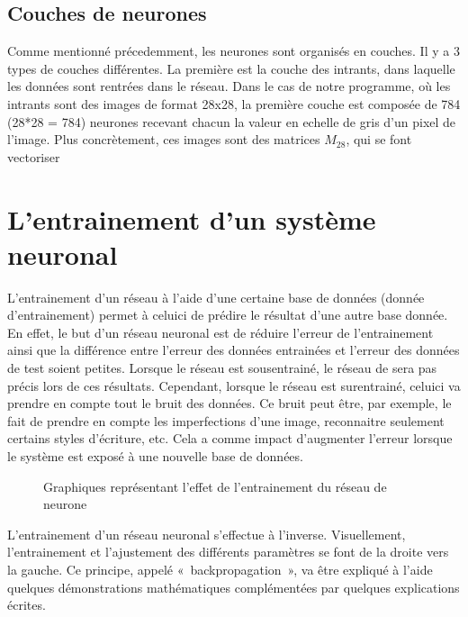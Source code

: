 \documentclass[letterpaper,10pt,french]{sphinxmanual}
\begin{document}
\subsection{Couches de neurones}
\label{\detokenize{OCR_SAM:couches-de-neurones}}
Comme mentionné précedemment, les neurones sont organisés en couches. Il y a 3 types de couches différentes. La première est la couche des intrants, dans laquelle
les données sont rentrées dans le réseau. Dans le cas de notre programme, où les intrants sont des images de format 28x28, la première couche est composée de 784 (28*28 = 784) neurones recevant chacun la valeur en echelle de gris  d’un pixel de l’image. Plus concrètement, ces images sont des matrices \(M_{28}\), qui se font vectoriser


\section{L’entrainement d’un système neuronal}
\label{\detokenize{OCR_SAM:l-entrainement-d-un-systeme-neuronal}}
L’entrainement d’un réseau à l’aide d’une certaine base de données (donnée d’entrainement) permet à celui\sphinxhyphen{}ci de prédire le résultat d’une autre base donnée. En effet, le but d’un réseau neuronal est de réduire l’erreur de l’entrainement ainsi que la différence entre l’erreur des données entrainées et l’erreur des données de test soient petites. Lorsque le réseau est sous\sphinxhyphen{}entrainé, le réseau de sera pas précis lors de ces résultats. Cependant, lorsque le réseau est sur\sphinxhyphen{}entrainé, celui\sphinxhyphen{}ci va prendre en compte tout le bruit des données. Ce bruit peut être, par exemple, le fait de prendre en compte les imperfections d’une image, reconnaitre seulement certains styles d’écriture, etc. Cela a comme impact d’augmenter l’erreur lorsque le système est exposé à une nouvelle base de données.

\begin{figure}[htbp]
\centering
\capstart

\noindent{}
\caption{Graphiques représentant l’effet de l’entrainement du réseau de neurone}\label{\detokenize{OCR_SAM:overfitting}}\end{figure}

L’entrainement d’un réseau neuronal s’effectue à l’inverse. Visuellement, l’entrainement et l’ajustement des différents paramètres se font de la droite vers la gauche. Ce principe, appelé « backpropagation », va être expliqué à l’aide quelques démonstrations mathématiques complémentées par quelques explications écrites.
\end{document}
